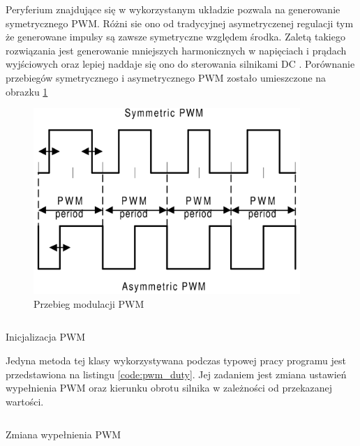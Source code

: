             Peryferium znajdujące się w wykorzystanym układzie pozwala na generowanie symetrycznego PWM. Różni sie ono od tradycyjnej asymetryczenej regulacji tym że generowane impulsy są zawsze symetryczne względem środka. Zaletą takiego rozwiązania jest generowanie mniejszych harmonicznych w napięciach i prądach wyjściowych oraz lepiej naddaje się ono do sterowania silnikami DC \cite{pwm_center}. Porównanie przebiegów symetrycznego i asymetrycznego PWM zostało umieszczone na obrazku \ref{fig:sym_pwm}
            
            \begin{figure}[ht]
                \centering
                \includegraphics[width=0.9\textwidth]{img/symetric_pwm.png}
                \caption{Przebieg modulacji PWM}
                \label{fig:sym_pwm}
            \end{figure}   
            
            
        \begin{kod}
          \inputminted[firstline=3,lastline=24]{cpp}{esp/listings/motor_driver.cpp}
          \caption{Inicjalizacja PWM}
          \label{code:pwm_init}
          \vspace{2em}
        \end{kod}
        
        Jedyna metoda tej klasy wykorzystywana podczas typowej pracy programu jest przedstawiona na listingu \ref{code:pwm_duty}. Jej zadaniem jest zmiana ustawień wypełnienia PWM oraz kierunku obrotu silnika w zależności od przekazanej wartości.
        
        \begin{kod}
          \inputminted[firstline=27]{cpp}{esp/listings/motor_driver.cpp}
          \caption{Zmiana wypełnienia PWM}
          \label{code:pwm_duty}
          \vspace{2em}
        \end{kod}